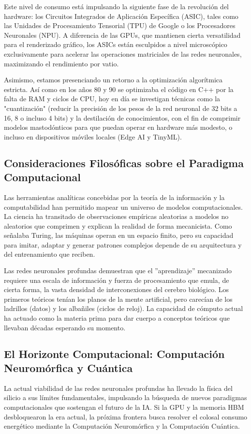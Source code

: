 \documentclass[12pt,a4paper]{article}
\begin{document}
Este nivel de consumo está impulsando la siguiente fase de la revolución del hardware: los Circuitos Integrados de Aplicación Específica (ASIC), tales como las Unidades de Procesamiento Tensorial (TPU) de Google o los Procesadores Neuronales (NPU). A diferencia de las GPUs, que mantienen cierta versatilidad para el renderizado gráfico, los ASICs están esculpidos a nivel microscópico exclusivamente para acelerar las operaciones matriciales de las redes neuronales, maximizando el rendimiento por vatio.

Asimismo, estamos presenciando un retorno a la optimización algorítmica estricta. Así como en los años 80 y 90 se optimizaba el código en C++ por la falta de RAM y ciclos de CPU, hoy en día se investigan técnicas como la "cuantización" (reducir la precisión de los pesos de la red neuronal de 32 bits a 16, 8 o incluso 4 bits) y la destilación de conocimientos, con el fin de comprimir modelos mastodónticos para que puedan operar en hardware más modesto, o incluso en dispositivos móviles locales (Edge AI y TinyML).

\subsection{Consideraciones Filosóficas sobre el Paradigma Computacional}
Las herramientas analíticas concebidas por la teoría de la información y la computabilidad han permitido mapear un universo de modelos computacionales. La ciencia ha transitado de observaciones empíricas aleatorias a modelos no aleatorios que comprimen y explican la realidad de forma mecanicista. Como señalaba Turing, las máquinas operan en un espacio finito, pero su capacidad para imitar, adaptar y generar patrones complejos depende de su arquitectura y del entrenamiento que reciben.

Las redes neuronales profundas demuestran que el ''aprendizaje'' mecanizado requiere una escala de información y fuerza de procesamiento que emula, de cierta forma, la vasta densidad de interconexiones del cerebro biológico. Los primeros teóricos tenían los planos de la mente artificial, pero carecían de los ladrillos (datos) y los albañiles (ciclos de reloj). La capacidad de cómputo actual ha actuado como la materia prima para dar cuerpo a conceptos teóricos que llevaban décadas esperando su momento.


\subsection{El Horizonte Computacional: Computación Neuromórfica y Cuántica}
La actual viabilidad de las redes neuronales profundas ha llevado la física del silicio a sus límites fundamentales, impulsando la búsqueda de nuevos paradigmas computacionales que sostengan el futuro de la IA. Si la GPU y la memoria HBM desbloquearon la era actual, la próxima frontera busca resolver el colosal consumo energético mediante la Computación Neuromórfica y la Computación Cuántica.
\end{document}
